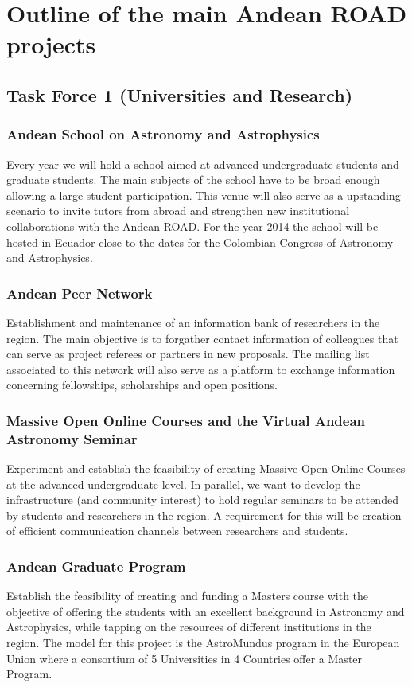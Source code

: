 \documentclass[12pt]{article}
\begin{document}
\section{Outline of the main Andean ROAD projects}

\subsection{Task Force 1 (Universities and Research)}

\subsubsection*{Andean School on Astronomy and Astrophysics}
Every year we will hold a school aimed at advanced undergraduate
students and graduate students. The main subjects of the school have
to be broad enough allowing a large student participation. This venue
will also serve as a upstanding scenario to invite tutors from abroad
and strengthen new institutional collaborations with the Andean
ROAD. For the year 2014 the school will be hosted in Ecuador close to
the dates for the Colombian Congress of Astronomy and Astrophysics. 

\subsubsection*{Andean Peer Network}
Establishment and maintenance of an information bank of researchers in
the region. The main objective is to forgather contact information of
colleagues that can serve as project referees or partners in new
proposals. The mailing list associated to this network will also serve
as a platform to exchange information concerning fellowships,
scholarships and open positions. 

\subsubsection*{Massive Open Online Courses and the Virtual Andean
  Astronomy Seminar} 
Experiment and establish the feasibility of creating Massive Open
Online Courses at the advanced undergraduate level. In parallel, we
want to develop the infrastructure (and community interest) to hold
regular seminars to be attended by students and researchers in the
region. A requirement for this will be creation of efficient
communication channels between researchers and students. 

\subsubsection*{Andean Graduate Program}
Establish the feasibility of creating and funding a Masters course
with the objective of offering the students with an excellent
background in Astronomy and Astrophysics, while tapping on the
resources of different institutions in the region. The model for this
project is the AstroMundus program in the European Union where a
consortium of 5 Universities in 4 Countries offer a Master Program. 
\end{document}
